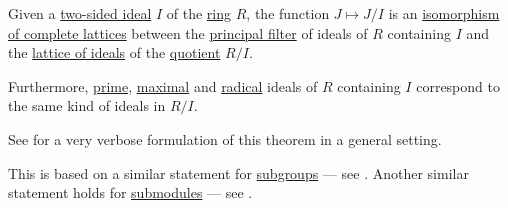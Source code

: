 \begin{theorem}\label{thm:lattice_theorem_for_ideals}
  Given a \hyperref[def:semiring_ideal]{two-sided ideal} \( I \) of the \hyperref[def:ring]{ring} \( R \), the function \( J \mapsto J / I \) is an \hyperref[def:lattice/homomorphism]{isomorphism of complete lattices} between the \hyperref[def:lattice_ideal/principal]{principal filter} of ideals of \( R \) containing \( I \) and the \hyperref[thm:semiring_of_ideals/lattice]{lattice of ideals} of the \hyperref[def:ring/quotient]{quotient} \( R / I \).

  Furthermore, \hyperref[def:semiring_ideal/prime]{prime}, \hyperref[def:semiring_ideal/maximal]{maximal} and \hyperref[def:radical_ideal]{radical} ideals of \( R \) containing \( I \) correspond to the same kind of ideals in \( R / I \).
\end{theorem}
\begin{comments}
  \item See  for a very verbose formulation of this theorem in a general setting.
  \item This is based on a similar statement for \hyperref[def:group/submodel]{subgroups} --- see . Another similar statement holds for \hyperref[def:module/submodel]{submodules} --- see .
\end{comments}
